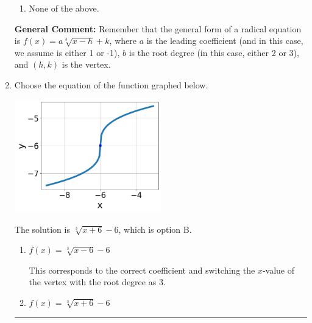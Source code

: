 \documentclass{extbook}[14pt]
\newcommand{\litem}[1]{\item #1

\rule{\textwidth}{0.4pt}}
\begin{document}
\begin{enumerate}
{\begin{enumerate}[label=\Alph*.]
\item None of the above.\end{enumerate}
\textbf{General Comment:} Remember that the general form of a radical equation is $ f(x) = a \sqrt[b]{x - h} + k $, where $a$ is the leading coefficient (and in this case, we assume is either 1 or -1), $b$ is the root degree (in this case, either 2 or 3), and $(h, k)$ is the vertex.
}
\litem{
Choose the equation of the function graphed below.

\begin{center}
    \includegraphics[width=0.5\textwidth]{../Figures/radicalGraphToEquationCopyB.png}
\end{center}



The solution is \( \sqrt[3]{x + 6} - 6 \), which is option B.\begin{enumerate}[label=\Alph*.]
\item \( f(x) = \sqrt[3]{x - 6} - 6 \)

This corresponds to the correct coefficient and switching the $x$-value of the vertex with the root degree as $3$.
\item \( f(x) = \sqrt[3]{x + 6} - 6 \)


\end{enumerate}}
\end{enumerate}
\end{document}
